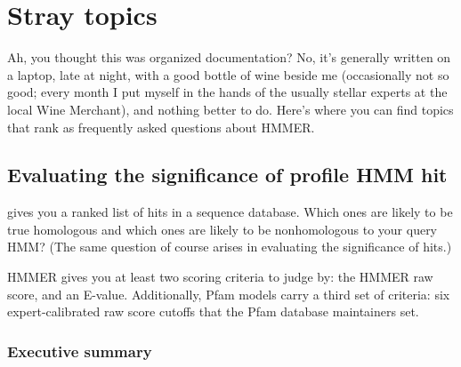 \chapter{Stray topics}

Ah, you thought this was organized documentation? No, it's generally
written on a laptop, late at night, with a good bottle of wine beside
me (occasionally not so good; every month I put myself in the hands of
the usually stellar experts at the local Wine Merchant), and nothing
better to do. Here's where you can find topics that rank as frequently
asked questions about HMMER.

\section{Evaluating the significance of profile HMM hit}

 gives you a ranked list of hits in a sequence
database.  Which ones are likely to be true homologous and which ones
are likely to be nonhomologous to your query HMM? (The same
question of course arises in evaluating the significance of
 hits.)

HMMER gives you at least two scoring criteria to judge by: the HMMER
raw score, and an E-value. Additionally, Pfam models carry a third set
of criteria: six expert-calibrated raw score cutoffs that the Pfam
database maintainers set.

\subsection{Executive summary}

